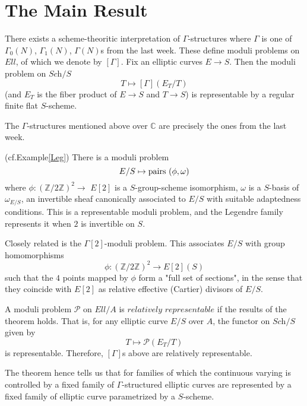 \documentclass[a4paper,11pt]{article}
\begin{document}
\section{The Main Result}

\begin{thm}
There exists a scheme-theoritic interpretation of $\Gamma$-structures where $\Gamma$ is one of $\Gamma_0(N)$, $\Gamma_1(N)$, $\Gamma(N)$s from the last week.
These define moduli problems on $Ell$, of which we denote by $[\Gamma]$.
Fix an elliptic curves $E\to$$S$.
Then the moduli problem on $\textit{Sch}/S$
\[
T \mapsto [\Gamma](E_T/T)
\]
(and $E_T$ is the fiber product of $E\to$$S$ and $T\to$$S$) is representable by a regular finite flat $S$-scheme.
\end{thm}

\begin{rem}
The $\Gamma$-structures mentioned above over $\mathbb{C}$ are precisely the ones from the last week.
\end{rem}

\begin{exm}(cf.Example\ref{Leg})
There is a moduli problem
\[
E/S \mapsto \textnormal{pairs } (\phi, \omega)
\]
where $\phi:(\mathbb{Z}/2\mathbb{Z})^2\to$ $E[2]$ is a $S$-group-scheme isomorphism, $\omega$ is a $S$-basis of $\omega_{E/S}$, an invertible sheaf canonically associated to $E/S$ with suitable adaptedness conditions.
This is a representable moduli problem, and the Legendre family represents it when $2$ is invertible on $S$.

Closely related is the $\Gamma[2]$-moduli problem.
This associates $E/S$ with group homomorphisms
\[
\phi:(\mathbb{Z}/2\mathbb{Z})^2 \to E[2](S)
\]
such that the $4$ points mapped by $\phi$ form a "full set of sections", in the sense that they coincide with $E[2]$ as relative effective (Cartier) divisors of $E/S$.
\end{exm}


\begin{defn}
A moduli problem $\mathcal{P}$ on $Ell/A$ is $\textit{relatively representable}$ if the results of the theorem holds.
That is, for any elliptic curve $E/S$ over $A$, the functor on $\textit{Sch}/S$ given by
\[
T \mapsto \mathcal{P}(E_T/T)
\]
is representable.
Therefore, $[\Gamma]$s above are relatively representable.
\end{defn}

The theorem hence tells us that for families of which the continuous varying is controlled by a fixed family of $\Gamma$-structured elliptic curves are represented by a fixed family of elliptic curve parametrized by a $S$-scheme.
\end{document}
